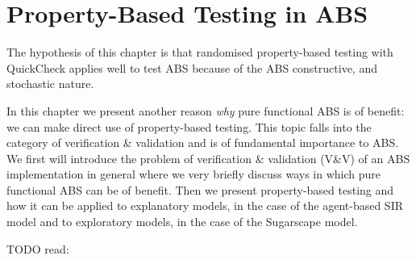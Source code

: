 \chapter{Property-Based Testing in ABS}
\label{ch:property}

The hypothesis of this chapter is that randomised property-based testing with QuickCheck applies well to test ABS because of the ABS constructive, and stochastic nature.

In this chapter we present another reason \textit{why} pure functional ABS is of benefit: we can make direct use of property-based testing. This topic falls into the category of verification \& validation and is of fundamental importance to ABS. We first will introduce the problem of verification \& validation (V\&V) of an ABS implementation in general where we very briefly discuss ways in which pure functional ABS can be of benefit. Then we present property-based testing and how it can be applied to explanatory models, in the case of the agent-based SIR model and to exploratory models, in the case of the Sugarscape model.

TODO read:










